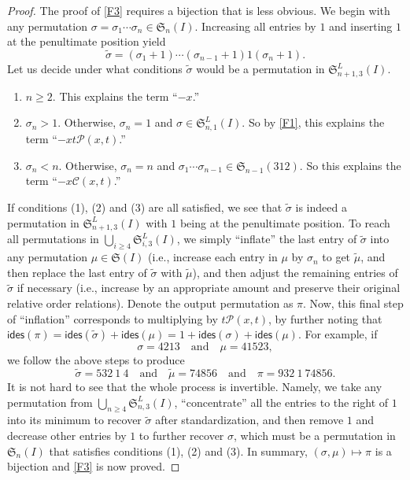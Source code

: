 \documentclass[reqno]{amsart}
\numberwithin{equation}{section}
\theoremstyle{plain}
\theoremstyle{definition}
\theoremstyle{named}
\newcommand{\fS}{\mathfrak{S}}
\newcommand{\ides}{\mathsf{ides}}
\newcommand{\cC}{\mathcal{C}}
\newcommand{\cP}{\mathcal{P}}
\begin{document}
\begin{proof}
	The proof of \eqref{F3} requires a bijection that is less obvious. We begin with any permutation $\sigma=\sigma_1\cdots\sigma_n\in\fS_n(I)$. Increasing all entries by $1$ and inserting $1$ at the penultimate position yield
	$$\tilde{\sigma}=(\sigma_1+1)\cdots(\sigma_{n-1}+1)1(\sigma_n+1).$$
	Let us decide under what conditions $\tilde{\sigma}$ would be a permutation in $\fS_{n+1,3}^L(I)$.
	\begin{enumerate}[label=(\arabic*), widest=9, itemindent=*, leftmargin=*]
		\item $n\ge 2$. This explains the term ``$-x$.''
		\item $\sigma_n>1$. Otherwise, $\sigma_n=1$ and $\sigma\in\fS_{n,1}^L(I)$. So by \eqref{F1}, this explains the term ``$-xt\cP(x,t)$.''
		\item $\sigma_n<n$. Otherwise, $\sigma_n=n$ and $\sigma_1\cdots\sigma_{n-1}\in\fS_{n-1}(312)$. So this explains the term ``$-x\cC(x,t)$.''
	\end{enumerate}
	If conditions (1), (2) and (3) are all satisfied, we see that $\tilde{\sigma}$ is indeed a permutation in $\fS_{n+1,3}^L(I)$ with $1$ being at the penultimate position. To reach all permutations in $\bigcup_{i\ge 4}\fS_{i,3}^L(I)$, we simply ``inflate'' the last entry of $\tilde{\sigma}$ into any permutation $\mu\in\fS(I)$ (i.e., increase each entry in $\mu$ by $\sigma_n$ to get $\tilde{\mu}$, and then replace the last entry of $\tilde{\sigma}$ with $\tilde{\mu}$), and then adjust the remaining entries of $\tilde{\sigma}$ if necessary (i.e., increase by an appropriate amount and preserve their original relative order relations). Denote the output permutation as $\pi$. Now, this final step of ``inflation'' corresponds to multiplying by $t\cP(x,t)$, by further noting that $\ides(\pi)=\ides(\tilde{\sigma})+\ides(\mu)=1+\ides(\sigma)+\ides(\mu)$. For example, if
	$$\sigma=4213 \quad\text{and}\quad \mu=41523,$$
	we follow the above steps to produce
	$$\tilde{\sigma}=532\:1\:4 \quad\text{and}\quad  \tilde{\mu}=74856 \quad\text{and}\quad \pi=932\:1\:74856.$$
	It is not hard to see that the whole process is invertible. Namely, we take any permutation from $\bigcup_{n\ge 4}\fS_{n,3}^L(I)$, ``concentrate'' all the entries to the right of $1$ into its minimum to recover $\tilde{\sigma}$ after standardization, and then remove $1$ and decrease other entries by $1$ to further recover $\sigma$, which must be a permutation in $\fS_n(I)$ that satisfies conditions (1), (2) and (3). In summary, $(\sigma,\mu)\mapsto \pi$ is a bijection and \eqref{F3} is now proved.
\end{proof}
\end{document}

